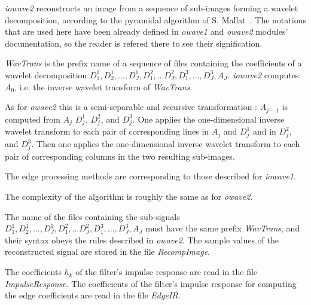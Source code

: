 \def\real{I\!\!R}


{\em iowave2} reconstructs an image from a sequence of sub-images forming 
a wavelet decomposition, according to the pyramidal algorithm of 
S. Mallat~\cite{mallat:theory}. 
The notations that are used here have been already defined in {\em owave1} 
and {\em owave2} modules' documentation, so the reader is refered 
there to see their signification. 

{\em WavTrans} is the prefix name of a sequence of files containing 
the coefficients of a wavelet decomposition  $D^{1}_{1}, D^{1}_{2}, \ldots, 
D^{1}_{J}, D^{2}_{1}, \ldots D^{2}_{J}, D^{3}_{1}, \ldots, D^{3}_{J}, A_{J}$. 
{\em iowave2} computes \( A_{0} \), i.e. the inverse wavelet transform 
of {\em WavTrans}. 

As for {\em owave2} this is a semi-separable and recursive transformation : 
\( A_{j-1} \) is computed from \( A_{j} \) \( D^{1}_{j} \), \( D^{2}_{j} \), 
and \( D^{3}_{j} \). One applies the one-dimensional inverse wavelet transform 
to each pair of corresponding lines in \( A_{j} \) and \( D^{1}_{j} \) and in 
$D^{2}_{j}$, and $D^{3}_{j}$. Then one applies the one-dimensional inverse 
wavelet transform to each pair of corresponding columns in the two resulting 
sub-images. 

The edge processing methods are corresponding to those described for 
{\em iowave1}.

The complexity of the algorithm is roughly the same as for {\em owave2}.

The name of the files containing the sub-signals 
$D^{1}_{1}, D^{1}_{2}, \ldots, D^{1}_{J}, D^{2}_{1}, \ldots D^{2}_{J}, 
D^{3}_{1}, \ldots, D^{3}_{J}, A_{J}$ must have the same prefix {\em WavTrans}, 
and their syntax obeys the rules described in {\em owave2}. 
The sample values of the reconstructed signal are stored in the file 
{\em RecompImage}. 

The coefficients \( h_{k} \) of the filter's impulse response are read 
in the file {\em ImpulseResponse}. The coefficients of the filter's 
impulse response for computing the edge coefficients are read in the file 
{\em EdgeIR}. 


